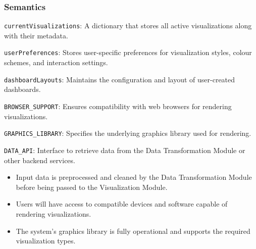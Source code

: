 \documentclass[12pt, titlepage]{article}
\begin{document}
\subsubsection{Semantics}
\begin{description}
  \item[State Variables:]
  \item \texttt{currentVisualizations}: A dictionary that stores all active visualizations along with their 
  metadata.
  \item \texttt{userPreferences}: Stores user-specific preferences for visualization styles, colour schemes,
  and interaction settings.
  \item \texttt{dashboardLayouts}: Maintains the configuration and layout of user-created dashboards.
  \item 

  \item[Environment Variables:] 
  \item \texttt{BROWSER\_SUPPORT}: Ensures compatibility with web browsers for rendering visualizations.
  \item \texttt{GRAPHICS\_LIBRARY}: Specifies the underlying graphics library used for rendering.
  \item \texttt{DATA\_API}: Interface to retrieve data from the Data Transformation Module or other 
  backend services.
  \item 

  \item[Assumptions:]
  \item
  \begin{itemize}
    \item Input data is preprocessed and cleaned by the Data Transformation Module before being passed to the
    Visualization Module.
  \end{itemize}
  \item 
  \begin{itemize}
    \item Users will have access to compatible devices and software capable of rendering visualizations.
  \end{itemize}
  \item 
  \begin{itemize}
    \item The system's graphics library is fully operational and supports the required visualization types.
  \end{itemize}
  \item 


\end{description}
\end{document}
